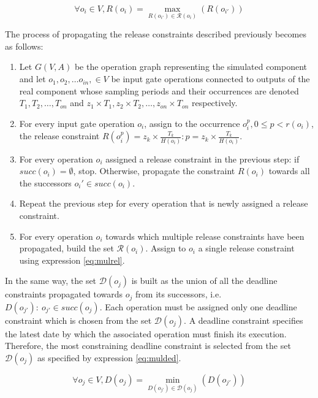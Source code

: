 \begin{equation}
\forall o_i \in V, R(o_i) = \max_{R(o_{i'}) \in \mathcal{R}(o_i)}(R(o_{i'}))
\label{eq:mulrel}
\end{equation}

The process of propagating the release constraints described previously becomes as follows:

\begin{enumerate}
\item Let $G(V,A)$ be the operation graph representing the simulated component and let $o_{1}, o_{2}, \ldots o_{in},\in  V$ be input gate operations connected to outputs of the real component whose sampling periods and their occurrences are denoted $T_{1}, T_{2}, \ldots, T_{on}$ and $z_1 \times T_1, z_2 \times T_2, \ldots, z_{on} \times T_{on}$ respectively.
\item For every input gate operation $o_{i}$, assign to the occurrence $o_{i}^{p}, 0 \leq p < r(o_{i})$, the release constraint $R(o_{i}^{p}) = z_k \times \frac{T_k}{H(o_{i})}: p = z_k \times \frac{T_{k}}{H(o_{i})}$.
\item For every operation $o_i$ assigned a release constraint in the previous step: if $succ(o_i) = \emptyset$, stop. Otherwise, propagate the constraint $R(o_i)$ towards all the successors $o_i' \in succ(o_i)$.
\item Repeat the previous step for every operation that is newly assigned a release constraint.
\item For every operation $o_i$ towards which multiple release constraints have been propagated, build the set $\mathcal{R}(o_i)$. Assign to $o_i$ a single release constraint using expression \ref{eq:mulrel}.
\end{enumerate}

In the same way, the set $\mathcal{D}(o_j)$ is built as the union of all the deadline constraints propagated towards $o_j$ from its successors, i.e. $D(o_{j'}):\ o_{j'} \in succ(o_j)$. Each operation must be assigned only one deadline constraint which is chosen from the set $\mathcal{D}(o_j)$. A deadline constraint specifies the latest date by which the associated operation must finish its execution. Therefore, the most constraining deadline constraint is selected from the set $\mathcal{D}(o_j)$ as specified by expression \ref{eq:mulded}.

\begin{equation}
\forall o_j \in V, D(o_j) = \min_{D(o_{j'}) \in \mathcal{D}(o_j) }(D(o_{j'}))
\label{eq:mulded}
\end{equation}

